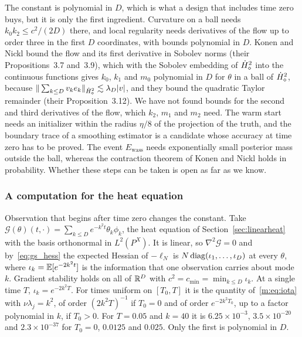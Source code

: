 The constant is polynomial in $D$, which is what a design that includes time zero buys, but it is only the first ingredient. Curvature on a ball needs $k_0k_2\le c^2/(2D)$ there, and local regularity needs derivatives of the flow up to order three in the first $D$ coordinates, with bounds polynomial in $D$. Konen and Nickl bound the flow and its first derivative in Sobolev norms (their Propositions~3.7 and~3.9), which with the Sobolev embedding of $\dot H^{2}_\diamond$ into the continuous functions gives $k_0$, $k_1$ and $m_0$ polynomial in $D$ for $\theta$ in a ball of $\dot H^{2}_\diamond$, because $\|\sum_{k\le D}v_ke_k\|_{\dot H^{2}_\diamond}\lesssim\lambda_D|v|$, and they bound the quadratic Taylor remainder (their Proposition~3.12). We have not found bounds for the second and third derivatives of the flow, which $k_2$, $m_1$ and $m_2$ need. The warm start needs an initializer within the radius $\eta/8$ of the projection of the truth, and the boundary trace of a smoothing estimator is a candidate whose accuracy at time zero has to be proved. The event $E_{\mathrm{wass}}$ needs exponentially small posterior mass outside the ball, whereas the contraction theorem of Konen and Nickl holds in probability. Whether these steps can be taken is open as far as we know.

\subsubsection{A computation for the heat equation} Observation that begins after time zero changes the constant. Take $\mathcal{G}(\theta)(t,\cdot)=\sum_{k\le D}e^{-k^2t}\theta_k\phi_k$, the heat equation of Section~\ref{sec:linearheat} with the basis orthonormal in $L^2(P^X)$. It is linear, so $\nabla^2\mathcal{G}=0$ and by~\eqref{eq:gs_hess} the expected Hessian of $-\ell_N$ is $N\operatorname{diag}(\iota_1,\dots,\iota_D)$ at every $\theta$, where $\iota_k=\mathbb{E}[e^{-2k^2t}]$ is the information that one observation carries about mode $k$. Gradient stability holds on all of $\mathbb{R}^D$ with $c^2=c_{\min}=\min_{k\le D}\iota_k$. At a single time $T$, $\iota_k=e^{-2k^2T}$. For times uniform on $[T_0,T]$ it is the quantity of~\eqref{m:eq:iota} with $\nu\lambda_j=k^2$, of order $(2k^2T)^{-1}$ if $T_0=0$ and of order $e^{-2k^2T_0}$, up to a factor polynomial in $k$, if $T_0>0$. For $T=0.05$ and $k=40$ it is $6.25\times10^{-3}$, $3.5\times10^{-20}$ and $2.3\times10^{-37}$ for $T_0=0$, $0.0125$ and $0.025$. Only the first is polynomial in $D$.

